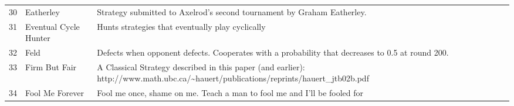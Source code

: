 \begin{table}[H]
\begin{adjustbox}{height=0.7\textwidth, width=1.1\textwidth}
\begin{tabular}{rlll}
	30   & Eatherley                   & Strategy submitted to Axelrod's second tournament by Graham Eatherley.                                                            \\
	31   & Eventual Cycle Hunter       & Hunts strategies that eventually play cyclically                                                                                  \\
	32   & Feld                        & Defects when opponent defects. Cooperates with a probability that decreases
	to 0.5 at round 200.                                                                                                                                                                                                                                                                                                                                                                                                                                                                                                                                                                                                                                                                                                                                                                                                                                                                                                                     \\
	33   & Firm But Fair               & A Classical Strategy described in this paper (and earlier):
	http://www.math.ubc.ca/\textasciitilde{}hauert/publications/reprints/hauert\_jtb02b.pdf                                                                                                                                                                                                                                                                                                                                                                                                                                                                                                                                                                                                                                                                                                                                                                                                                                                                                   \\
	34   & Fool Me Forever             & Fool me once, shame on me. Teach a man to fool me and I'll be fooled for

\end{tabular}
\end{adjustbox}
\end{table}
